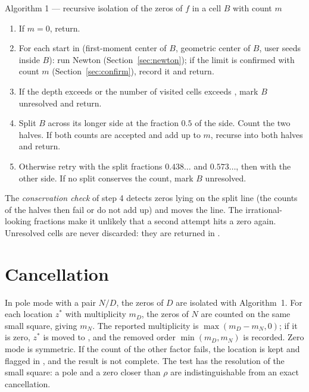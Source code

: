 \begin{algobox}{Algorithm 1 — recursive isolation of the zeros of $f$ in a cell $B$ with count $m$}
\begin{enumerate}[leftmargin=1.7em]
  \item If $m=0$, return.
  \item For each start in (first-moment center of $B$, geometric center of
        $B$, user seeds inside $B$): run Newton (Section~\ref{sec:newton});
        if the limit is confirmed with count $m$ (Section~\ref{sec:confirm}),
        record it and return.
  \item If the depth exceeds  or the number of visited cells
        exceeds , mark $B$ unresolved and return.
  \item Split $B$ across its longer side at the fraction $0.5$ of the side.
        Count the two halves. If both counts are accepted and add up to $m$,
        recurse into both halves and return.
  \item Otherwise retry with the split fractions $0.438\ldots$ and
        $0.573\ldots$, then with the other side. If no split conserves the
        count, mark $B$ unresolved.
\end{enumerate}
\end{algobox}

The \emph{conservation check} of step 4 detects zeros lying on the split
line (the counts of the halves then fail or do not add up) and moves the
line. The irrational-looking fractions make it unlikely that a second
attempt hits a zero again. Unresolved cells are never discarded: they are
returned in .

\section{Cancellation}\label{sec:cancel}

In pole mode with a pair $N/D$, the zeros of $D$ are isolated with
Algorithm~1. For each location $z^\ast$ with multiplicity $m_D$, the zeros of
$N$ are counted on the same small square, giving $m_N$. The reported
multiplicity is $\max(m_D-m_N,0)$; if it is zero, $z^\ast$ is moved to
, and the removed order $\min(m_D,m_N)$ is recorded.
Zero mode is symmetric. If the count of the other factor fails, the location
is kept and flagged in , and the result is not
complete. The test has the resolution of the small square: a pole and a zero
closer than $\rho$ are indistinguishable from an exact cancellation.

